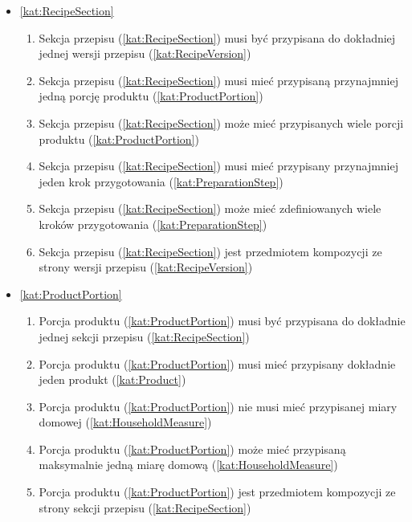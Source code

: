 \begin{itemize}[label={\textbf{Reguły dla}}, wide, labelwidth=!, labelindent=0pt]
\begin{enumerate}[label={\textbf{REG/\protect\threedigits{\arabic{enumi}}}}, wide, labelwidth=!, align=left, leftmargin=3cm, resume]
    \end{enumerate}
    \item\ref{kat:RecipeSection}
    \begin{enumerate}[label={\textbf{REG/\protect\threedigits{\arabic{enumi}}}}, wide, labelwidth=!, align=left, leftmargin=3cm, resume]
        \item Sekcja przepisu (\ref{kat:RecipeSection}) musi być przypisana do dokładniej jednej wersji przepisu (\ref{kat:RecipeVersion})
        \item Sekcja przepisu (\ref{kat:RecipeSection}) musi mieć przypisaną przynajmniej jedną porcję produktu (\ref{kat:ProductPortion})
        \item Sekcja przepisu (\ref{kat:RecipeSection}) może mieć przypisanych wiele porcji produktu (\ref{kat:ProductPortion})
        \item Sekcja przepisu (\ref{kat:RecipeSection}) musi mieć przypisany przynajmniej jeden krok przygotowania (\ref{kat:PreparationStep})
        \item Sekcja przepisu (\ref{kat:RecipeSection}) może mieć zdefiniowanych wiele kroków przygotowania (\ref{kat:PreparationStep})
        \item Sekcja przepisu (\ref{kat:RecipeSection}) jest przedmiotem kompozycji ze strony wersji przepisu (\ref{kat:RecipeVersion})
    \end{enumerate}
    \item\ref{kat:ProductPortion}
    \begin{enumerate}[label={\textbf{REG/\protect\threedigits{\arabic{enumi}}}}, wide, labelwidth=!, align=left, leftmargin=3cm, resume]
        \item Porcja produktu (\ref{kat:ProductPortion}) musi być przypisana do dokładnie jednej sekcji przepisu (\ref{kat:RecipeSection})
        \item Porcja produktu (\ref{kat:ProductPortion}) musi mieć przypisany dokładnie jeden produkt (\ref{kat:Product})
        \item Porcja produktu (\ref{kat:ProductPortion}) nie musi mieć przypisanej miary domowej (\ref{kat:HouseholdMeasure})
        \item Porcja produktu (\ref{kat:ProductPortion}) może mieć przypisaną maksymalnie jedną miarę domową (\ref{kat:HouseholdMeasure})
        \item Porcja produktu (\ref{kat:ProductPortion}) jest przedmiotem kompozycji ze strony sekcji przepisu (\ref{kat:RecipeSection})

\end{enumerate}
\end{itemize}
